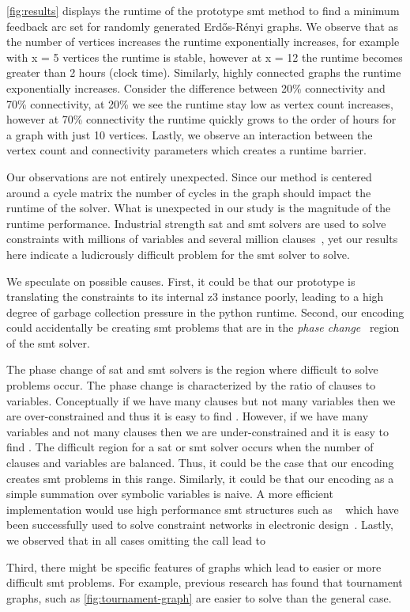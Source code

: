 \autoref{fig:results} displays the runtime of the prototype \ac{smt} method to
find a minimum feedback arc set for randomly generated Erd\H{o}s-R\'{e}nyi
graphs. We observe that as the number of vertices increases the runtime
exponentially increases, for example with x = 5 vertices the runtime is stable,
however at x = 12 the runtime becomes greater than 2 hours (clock time).
Similarly, highly connected graphs the runtime exponentially increases. Consider
the difference between 20\% connectivity and 70\% connectivity, at 20\% we see
the runtime stay low as vertex count increases, however at 70\% connectivity the
runtime quickly grows to the order of hours for a graph with just 10 vertices.
Lastly, we observe an interaction between the vertex count and connectivity
parameters which creates a runtime barrier.

Our observations are not entirely unexpected. Since our method is centered
around a cycle matrix the number of cycles in the graph should impact the
runtime of the solver. What is unexpected in our study is the magnitude of the
runtime performance. Industrial strength \ac{sat} and \ac{smt} solvers are used
to solve constraints with millions of variables and several million
clauses~\cite{10.5555/1550723}, yet our results here indicate a ludicrously
difficult problem for the \ac{smt} solver to solve.

We speculate on possible causes. First, it could be that our prototype is
translating the constraints to its internal z3 instance poorly, leading to a
high degree of garbage collection pressure in the python runtime. Second, our
encoding could accidentally be creating \ac{smt} problems that are in the
\emph{phase change}~\cite{Gent94thesat} region of the \ac{smt} solver.

The phase change of \ac{sat} and \ac{smt} solvers is the region where difficult
to solve problems occur. The phase change is characterized by the ratio of
clauses to variables. Conceptually if we have many clauses but not many
variables then we are over-constrained and thus it is easy to find .
However, if we have many variables and not many clauses then we are
under-constrained and it is easy to find . The difficult region for a
\ac{sat} or \ac{smt} solver occurs when the number of clauses and variables are
balanced. Thus, it could be the case that our encoding creates \ac{smt} problems
in this range. Similarly, it could be that our encoding as a simple summation
over symbolic variables is naive. A more efficient implementation would use high
performance \ac{smt} structures such as ~\cite{BarFT-SMTLIB}
which have been successfully used to solve constraint networks in electronic
design~\cite{10.5555/1550723}. Lastly, we observed that in all cases omitting
the  call lead to


Third, there might be specific features of graphs which lead to easier or more
difficult \ac{smt} problems. For example, previous research has found that
tournament graphs, such as \autoref{fig:tournament-graph} are easier to solve
than the general case.

